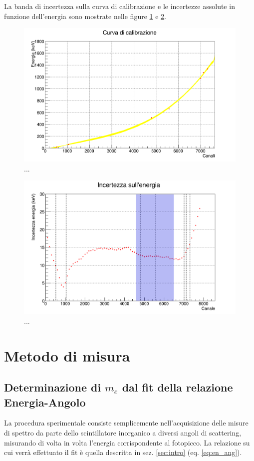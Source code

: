 \documentclass[5pt]{article}
\begin{document}
La banda di incertezza sulla curva di calibrazione e le incertezze assolute in funzione dell'energia sono mostrate nelle figure \ref{fig:calib_en} e \ref{fig:err_en}.

\begin{figure}[h!] 
\includegraphics[width=\textwidth]{"calibrazione2"}
\caption{...}
\label{fig:calib_en}
\end{figure}

\begin{figure}[h!] 
\includegraphics[width=\textwidth]{"err_en4"}
\caption{...}
\label{fig:err_en}
\end{figure}


\section{Metodo di misura}
\subsection{Determinazione di $m_e$ dal fit della relazione Energia-Angolo}
La procedura sperimentale consiste semplicemente nell'acquisizione delle misure di spettro da parte dello scintillatore inorganico a diversi angoli di scattering, misurando di volta in volta l'energia corrispondente al fotopicco. La relazione su cui verrà effettuato il fit è quella descritta in sez. \ref{sec:intro} (eq. \ref{eq:en_ang}).
\end{document}
